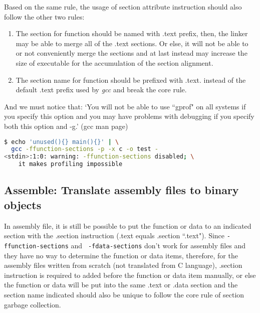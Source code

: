 \documentclass[10pt,a4paper]{article}
\begin{document}
\begin{multicols}{2}
Based on the same rule, the usage of section attribute instruction should also
follow the other two rules:

\begin{enumerate}

	\item The section for function should be named with .text prefix, then,
	the linker may be able to merge all of the .text sections. Or else, it
	will not be able to or not conveniently merge the sections and at last
	instead may increase the size of executable for the accumulation of
	the section alignment.

	\item The section name for function should be prefixed with .text.
	instead of the default .text prefix used by {\em gcc} and break the core rule.

\end{enumerate}

And we must notice that: `You will not be able to use ``gprof" on all systems if
you specify this option and you may have problems with debugging if you specify
both this option and -g.' (gcc man page)

\begin{lstlisting}[language=bash,
                  commentstyle=\fontsize{7}{8}\selectfont,
                  basicstyle=\ttfamily\fontsize{7}{8}\selectfont]
$ echo 'unused(){} main(){}' | \
  gcc -ffunction-sections -p -x c -o test -
<stdin>:1:0: warning: -ffunction-sections disabled; \
	it makes profiling impossible
\end{lstlisting}

\subsection{Assemble: Translate assembly files to binary objects}

In assembly file, it is still be possible to put the function or data to an
indicated section with the .section instruction (.text equals .section
``.text"). Since {\small {\tt -ffunction-sections}} and {\small {\tt
-fdata-sections}} don't work for assembly files and they have no way to determine
the function or data items, therefore, for the assembly files written from
scratch (not translated from C language), .section instruction is required to
added before the function or data item manually, or else the function or data
will be put into the same .text or .data section and the section name indicated
should also be unique to follow the core rule of section garbage collection.


\end{multicols}
\end{document}
